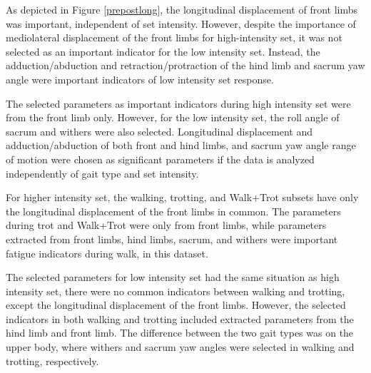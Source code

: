 As depicted in Figure \ref{prepostlong}, the longitudinal displacement of front limbs was important, independent of \gls{set} intensity. However, despite the importance of mediolateral displacement of the front limbs for high-intensity \gls{set}, it was not selected as an important indicator for the low intensity \gls{set}. Instead, the adduction/abduction and retraction/protraction of the hind limb and sacrum yaw angle were important indicators of low intensity \gls{set} response. 

The selected parameters as important indicators during high intensity \gls{set} were from the front limb only. However, for the low intensity \gls{set}, the roll angle of sacrum and withers were also selected. Longitudinal displacement and adduction/abduction of both front and hind limbs, and sacrum yaw angle range of motion were chosen as significant parameters if the data is analyzed independently of gait type and \gls{set} intensity.

For higher intensity \gls{set}, the walking, trotting, and Walk+Trot subsets have only the longitudinal displacement of the front limbs in common. The parameters during trot and Walk+Trot were only from front limbs, while parameters extracted from front limbs, hind limbs, sacrum, and withers were important fatigue indicators during walk, in this dataset.

The selected parameters for low intensity \gls{set} had the same situation as high intensity \gls{set}, there were no common indicators between walking and trotting, except the longitudinal displacement of the front limbs. However, the selected indicators in both walking and trotting included extracted parameters from the hind limb and front limb. The difference between the two gait types was on the upper body, where withers and sacrum yaw angles were selected in walking and trotting, respectively.

